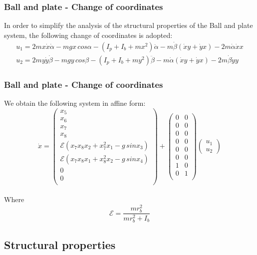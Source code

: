 %
\begin{frame}
\frametitle{Ball and plate - Change of coordinates}
In order to simplify the analysis of the structural properties of the Ball and plate system, the following change of coordinates is adopted:
\begin{align}
	u_1 = 2mx\dot{x}\dot{\alpha} - mgx\,cos\alpha - \left(I_p + I_b + mx^2\right)\ddot{\alpha} - m\dot{\beta}\left(\dot{x}y + \dot{y}x\right) - 2m\dot{\alpha}\dot{x}x \nonumber \\
	u_2 = 2my\dot{y}\dot{\beta} - mgy\,cos\beta - \left(I_p + I_b + my^2\right)\ddot{\beta} - m\dot{\alpha}\left(\dot{x}y + \dot{y}x\right) - 2m\dot{\beta}\dot{y}y \nonumber
\end{align}
\end{frame}
%
\begin{frame}
\frametitle{Ball and plate - Change of coordinates}
We obtain the following system in affine form:
\begin{equation}\label{BP_equations}
\dot{x} =%
	\begin{pmatrix}
	x_5\\
	x_6\\
	x_7\\
	x_8\\
	\mathcal{E}(x_7x_8x_2 + x^2_7x_1 - g\,sinx_3)\\
	\mathcal{E}(x_7x_8x_1 + x^2_8x_2 - g\,sinx_4)\\
	0\\
	0\\
	\end{pmatrix}
	+
	\begin{pmatrix}
		0 &0\\
		0 &0\\
		0 &0\\
		0 &0\\
		0 &0\\
		0 &0\\
		1 &0\\
		0 &1\\
	\end{pmatrix}
	\begin{pmatrix}
		u_1\\
	 	u_2
	\end{pmatrix}
\end{equation}\\[10pt]
Where \[\mathcal{E} = \frac{mr^2_b}{mr^2_b + I_b}\]
\end{frame}
%
\subsection{Structural properties}
